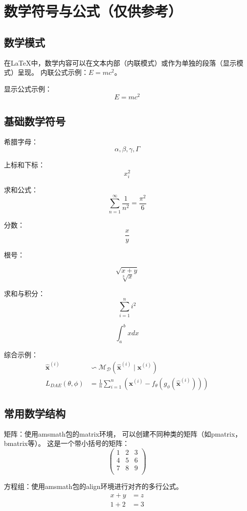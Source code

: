 \chapter{数学符号与公式（仅供参考）}
\section{数学模式}
在LaTeX中，数学内容可以在文本内部（内联模式）或作为单独的段落（显示模式）呈现。
内联公式示例：$E=mc^2$。

显示公式示例：
\[E=mc^2\]

\section{基础数学符号}

希腊字母：
\[\alpha, \beta, \gamma, \Gamma\]

上标和下标：
\[x_i^2\]

求和公式：
\[\sum_{n=1}^{\infty} \frac{1}{n^2} = \frac{\pi^2}{6}\]

分数：
\[\frac{x}{y}\]

根号：

\[\sqrt{x+y}\]
\[\sqrt[3]{x}\]

求和与积分：
\[\sum_{i=1}^n i^2\]

\[\int_a^b x dx\]

综合示例：
\begin{align}       %
    \hat{\bm{x}}^{(i)} 
    & \backsim \mathcal{M}_{\mathcal{D}}(\hat{\bm{x}}^{(i)} \mid \bm{x}^{(i)}) \label{eq:denoising_autoencoder_corrupt}   \\
    L_{DAE}(\theta,\phi)
    &=\frac{1}{n} \sum_{i=1}^{n}(\bm{x}^{(i)} - f_{\theta}(g_{\phi}(\hat{\bm{x}}^{(i)} ))) \label{eq:denoising_autoencoder_loss}
\end{align}


\section{常用数学结构}

矩阵：使用amsmath包的matrix环境，
可以创建不同种类的矩阵（如pmatrix，bmatrix等）。
这是一个带小括号的矩阵：
\[
\begin{pmatrix}
  1 & 2 & 3 \\
  4 & 5 & 6 \\
  7 & 8 & 9 \\
\end{pmatrix}
\]

方程组：使用amsmath包的align环境进行对齐的多行公式。
\begin{align}
    x + y &= z \\
    1 + 2 &= 3
\end{align}

